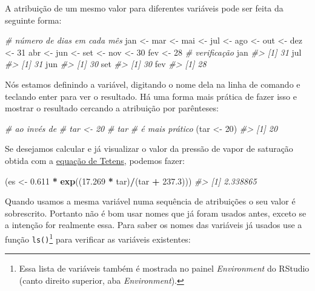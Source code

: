 \documentclass[]{book}
\newenvironment{Shaded}{\begin{snugshade}}{\end{snugshade}}
\newcommand{\KeywordTok}[1]{\textcolor[rgb]{0.13,0.29,0.53}{\textbf{#1}}}
\newcommand{\DecValTok}[1]{\textcolor[rgb]{0.00,0.00,0.81}{#1}}
\newcommand{\FloatTok}[1]{\textcolor[rgb]{0.00,0.00,0.81}{#1}}
\newcommand{\StringTok}[1]{\textcolor[rgb]{0.31,0.60,0.02}{#1}}
\newcommand{\CommentTok}[1]{\textcolor[rgb]{0.56,0.35,0.01}{\textit{#1}}}
\newcommand{\OperatorTok}[1]{\textcolor[rgb]{0.81,0.36,0.00}{\textbf{#1}}}
\newcommand{\NormalTok}[1]{#1}
\let\rmarkdownfootnote\footnote%
\def\footnote{\protect\rmarkdownfootnote}
\begin{document}
A atribuição de um mesmo valor para diferentes variáveis pode ser feita
da seguinte forma:

\begin{Shaded}
\begin{Highlighting}[]
\CommentTok{# número de dias em cada mês}
\NormalTok{jan <-}\StringTok{ }\NormalTok{mar <-}\StringTok{ }\NormalTok{mai <-}\StringTok{ }\NormalTok{jul <-}\StringTok{ }\NormalTok{ago <-}\StringTok{ }\NormalTok{out <-}\StringTok{ }\NormalTok{dez <-}\StringTok{ }\DecValTok{31}
\NormalTok{abr <-}\StringTok{ }\NormalTok{jun <-}\StringTok{ }\NormalTok{set <-}\StringTok{ }\NormalTok{nov <-}\StringTok{ }\DecValTok{30}
\NormalTok{fev <-}\StringTok{ }\DecValTok{28}
\CommentTok{# verificação}
\NormalTok{jan}
\CommentTok{#> [1] 31}
\NormalTok{jul}
\CommentTok{#> [1] 31}
\NormalTok{jun}
\CommentTok{#> [1] 30}
\NormalTok{set}
\CommentTok{#> [1] 30}
\NormalTok{fev}
\CommentTok{#> [1] 28}
\end{Highlighting}
\end{Shaded}

Nós estamos definindo a variável, digitando o nome dela na linha de
comando e teclando enter para ver o resultado. Há uma forma mais prática
de fazer isso e mostrar o resultado cercando a atribuição por
parênteses:

\begin{Shaded}
\begin{Highlighting}[]
\CommentTok{# ao invés de }
\CommentTok{# tar <- 20}
\CommentTok{# tar}
\CommentTok{# é mais prático}
\NormalTok{(tar <-}\StringTok{ }\DecValTok{20}\NormalTok{) }
\CommentTok{#> [1] 20}
\end{Highlighting}
\end{Shaded}

Se desejamos calcular e já visualizar o valor da pressão de vapor de
saturação obtida com a
\href{https://en.wikipedia.org/wiki/Tetens_equation}{equação de Tetens},
podemos fazer:

\begin{Shaded}
\begin{Highlighting}[]
\NormalTok{(es <-}\StringTok{ }\FloatTok{0.611} \OperatorTok{*}\StringTok{ }\KeywordTok{exp}\NormalTok{((}\FloatTok{17.269} \OperatorTok{*}\StringTok{ }\NormalTok{tar)}\OperatorTok{/}\NormalTok{(tar }\OperatorTok{+}\StringTok{ }\FloatTok{237.3}\NormalTok{)))}
\CommentTok{#> [1] 2.338865}
\end{Highlighting}
\end{Shaded}

Quando usamos a mesma variável numa sequência de atribuições o seu valor
é sobrescrito. Portanto não é bom usar nomes que já foram usados antes,
exceto se a intenção for realmente essa. Para saber os nomes das
variáveis já usados use a função \texttt{ls()}\footnote{Essa lista de
  variáveis também é mostrada no painel \emph{Environment} do RStudio
  (canto direito superior, aba \emph{Environment}).} para verificar as
variáveis existentes:
\end{document}
